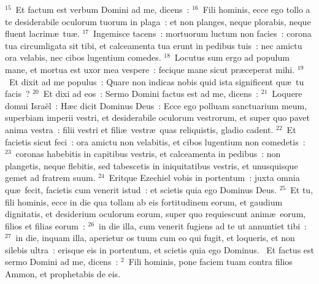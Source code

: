 ${}^{15}$~Et factum est verbum Domini ad me, dicens~:
${}^{16}$~Fili hominis, ecce ego tollo a te desiderabile oculorum tuorum in plaga~: et non planges, neque plorabis, neque fluent lacrim\ae\ tu\ae .
${}^{17}$~Ingemisce tacens~: mortuorum luctum non facies~: corona tua circumligata sit tibi, et calceamenta tua erunt in pedibus tuis~: nec amictu ora velabis, nec cibos lugentium comedes.
${}^{18}$~Locutus sum ergo ad populum mane, et mortua est uxor mea vespere~: fecique mane sicut pr\ae ceperat mihi.
${}^{19}$~Et dixit ad me populus~: Quare non indicas nobis quid ista significent qu\ae\ tu facis~?
${}^{20}$~Et dixi ad eos~: Sermo Domini factus est ad me, dicens~:
${}^{21}$~Loquere domui Isra\"el~: H\ae c dicit Dominus Deus~: Ecce ego polluam sanctuarium meum, superbiam imperii vestri, et desiderabile oculorum vestrorum, et super quo pavet anima vestra~: filii vestri et fili\ae\ vestr\ae\ quas reliquistis, gladio cadent.
${}^{22}$~Et facietis sicut feci~: ora amictu non velabitis, et cibos lugentium non comedetis~:
${}^{23}$~coronas habebitis in capitibus vestris, et calceamenta in pedibus~: non plangetis, neque flebitis, sed tabescetis in iniquitatibus vestris, et unusquisque gemet ad fratrem suum.
${}^{24}$~Eritque Ezechiel vobis in portentum~: juxta omnia qu\ae\ fecit, facietis cum venerit istud~: et scietis quia ego Dominus Deus.
${}^{25}$~Et tu, fili hominis, ecce in die qua tollam ab eis fortitudinem eorum, et gaudium dignitatis, et desiderium oculorum eorum, super quo requiescunt anim\ae\ eorum, filios et filias eorum~:
${}^{26}$~in die illa, cum venerit fugiens ad te ut annuntiet tibi~:
${}^{27}$~in die, inquam illa, aperietur os tuum cum eo qui fugit, et loqueris, et non silebis ultra~: erisque eis in portentum, et scietis quia ego Dominus.
~Et factus est sermo Domini ad me, dicens~:
${}^{2}$~Fili hominis, pone faciem tuam contra filios Ammon, et prophetabis de eis.
